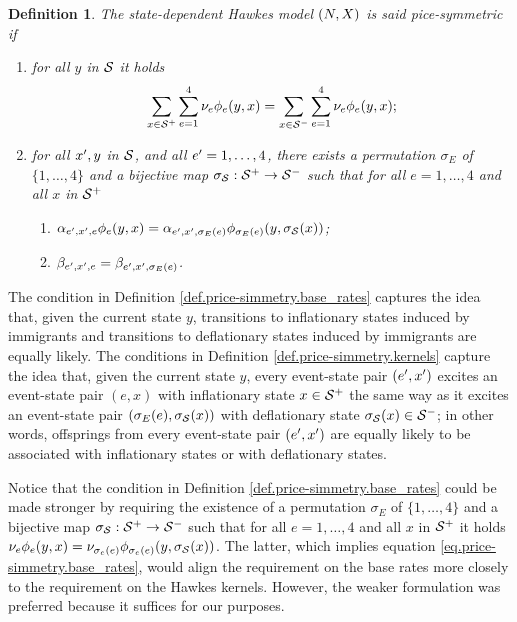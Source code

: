 \documentclass[10pt, article,table]{article}
\newtheorem{defi}[thm]{Definition}
\begin{document}
\begin{defi}\label{def.price-simmetry}
 The state-dependent Hawkes model $(N,X)$ is said pice-symmetric if 
 \begin{enumerate}[label={\roman{*}.} , ref={\ref{def.price-simmetry}.\roman{*}}]
 \item\label{def.price-simmetry.base_rates}
 for all $y$ in $\mathcal{S}$ it holds
 \begin{equation}\label{eq.price-simmetry.base_rates}
  \sum_{x\in\mathcal{S}^{+}}\sum_{e=1}^{4}\nu_{e}\phi_{e}(y,x)
  =
  \sum_{x\in\mathcal{S}^{-}}\sum_{e=1}^{4}\nu_{e}\phi_{e}(y,x);
 \end{equation}
\item\label{def.price-simmetry.kernels}
for all $x^{\prime},y$ in $\mathcal{S}$, and  all $e^{\prime} = 1,\dots,4$, there exists a permutation $\sigma_{E}$ of $\lbrace 1,\dots,4\rbrace$ and a bijective map $\sigma_{\mathcal{S}} : \mathcal{S}^{+}\rightarrow\mathcal{S}^{-}$ such that for all $e=1,\dots,4$ and all $x$ in $\mathcal{S}^{+}$
\begin{enumerate}%
\item $\alpha_{e^{\prime},x^{\prime},e}\phi_{e}(y,x) = \alpha_{e^{\prime},x^{\prime},\sigma_{E}(e)} \phi_{\sigma_{E}(e)}(y,\sigma_{\mathcal{S}}(x))$;
\item $\beta_{e^{\prime},x^{\prime},e} = \beta_{e^{\prime},x^{\prime},\sigma_{E}(e)}$.
\end{enumerate}
\end{enumerate}
\end{defi}
The condition in Definition \ref{def.price-simmetry.base_rates}  captures the idea that, given the current state $y$, 
transitions to inflationary states induced by immigrants and transitions to deflationary states induced by immigrants are equally likely.
The conditions in Definition \ref{def.price-simmetry.kernels} capture the idea that, given the current state $y$, every event-state pair $(e^{\prime},x^{\prime})$ excites an  event-state pair $(e,x)$ with inflationary state $x\in\mathcal{S}^{+}$  the same way as it excites an event-state pair $(\sigma_{E}(e),\sigma_{\mathcal{S}}(x))$ with deflationary state $\sigma_{\mathcal{S}}(x) \in\mathcal{S}^{-}$; in other words, offsprings from every event-state pair $(e^{\prime},x^{\prime})$ are equally likely to be associated with inflationary states or with deflationary states. 

Notice that the condition in Definition \ref{def.price-simmetry.base_rates} could be made stronger by requiring the existence of a permutation $\sigma_E$ of $\lbrace 1,\dots,4\rbrace$ and a bijective map $\sigma_{\mathcal{S}} : \mathcal{S}^{+}\rightarrow\mathcal{S}^{-}$ such that for all $e=1,\dots,4$ and all $x$ in $\mathcal{S}^{+}$ it holds $\nu_{e}\phi_{e}(y,x) = \nu_{\sigma_{e}(e)}\phi_{\sigma_{e}(e)}(y,\sigma_{\mathcal{S}}(x))$. The latter, which  implies equation \eqref{eq.price-simmetry.base_rates}, would align the requirement on the base rates more closely to the requirement on the Hawkes kernels. However, the weaker formulation was preferred because it suffices for our purposes. 
\end{document}
